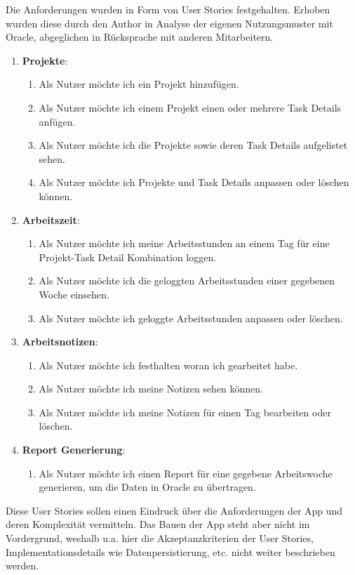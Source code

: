 \documentclass[oneside,bibliography=totocnumbered,BCOR=5mm]{scrbook}
\begin{document}
Die Anforderungen wurden in Form von User Stories festgehalten. Erhoben wurden
diese durch den Author in Analyse der eigenen Nutzungsmuster mit Oracle,
abgeglichen in Rücksprache mit anderen Mitarbeitern.

\begin{enumerate}
  \item \textbf{Projekte}:
    \begin{enumerate}
      \item Als Nutzer möchte ich ein Projekt hinzufügen.
      \item Als Nutzer möchte ich einem Projekt einen oder mehrere Task Details anfügen.
      \item Als Nutzer möchte ich die Projekte sowie deren Task Details aufgelistet sehen.
      \item Als Nutzer möchte ich Projekte und Task Details anpassen oder löschen können.
    \end{enumerate}
  \item \textbf{Arbeitszeit}:
    \begin{enumerate}
      \item Als Nutzer möchte ich meine Arbeitsstunden an einem Tag für eine Projekt-Task Detail Kombination loggen.
      \item Als Nutzer möchte ich die geloggten Arbeitsstunden einer gegebenen Woche einsehen.
      \item Als Nutzer möchte ich geloggte Arbeitsstunden anpassen oder löschen.
    \end{enumerate}
  \item \textbf{Arbeitsnotizen}:
    \begin{enumerate}
      \item Als Nutzer möchte ich festhalten woran ich gearbeitet habe.
      \item Als Nutzer möchte ich meine Notizen sehen können.
      \item Als Nutzer möchte ich meine Notizen für einen Tag bearbeiten oder löschen.
    \end{enumerate}
  \item \textbf{Report Generierung}:
    \begin{enumerate}
      \item Als Nutzer möchte ich einen Report für eine gegebene Arbeitswoche generieren, um die Daten in Oracle zu übertragen.
    \end{enumerate}
\end{enumerate}

Diese User Stories sollen einen Eindruck über die Anforderungen der App
und deren Komplexität vermitteln. Das Bauen der App steht aber nicht im
Vordergrund, weshalb u.a. hier die Akzeptanzkriterien der User Stories,
Implementationsdetails wie Datenpersistierung, etc. nicht weiter beschrieben
werden.
\end{document}
